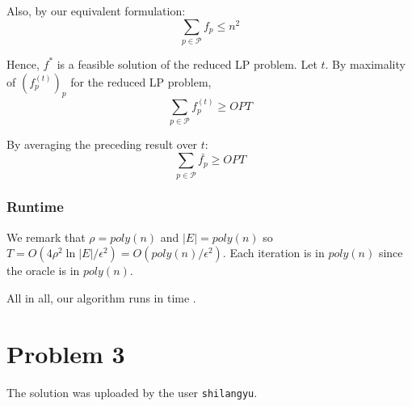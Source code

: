 \documentclass[a4paper, 11pt]{article}
\begin{document}
Also, by our equivalent formulation:
$$
\sum_{p \in \mathcal{P}}f_p \le n^2
$$

Hence, $f^*$ is a feasible solution of the reduced LP problem. Let $t$. By maximality of $(f_p^{(t)})_p$ for the reduced LP problem,
$$\sum_{p \in \mathcal{P}} f_p^{(t)} \ge OPT$$

By averaging the preceding result over $t$:
$$\boxed{\sum_{p \in \mathcal{P}}\bar{f_p} \ge OPT}$$

\subsubsection*{Runtime}


We remark that $\rho = poly(n)$ and $|E|=poly(n)$ so $T = O(4\rho^2\ln{|E|}/\epsilon^2) = O(poly(n)/\epsilon^2)$. Each iteration is in $poly(n)$ since the oracle is in $poly(n)$.

All in all, our algorithm runs in time .

\newpage

\section*{Problem 3}

The solution was uploaded by the user \texttt{shilangyu}.
\end{document}
